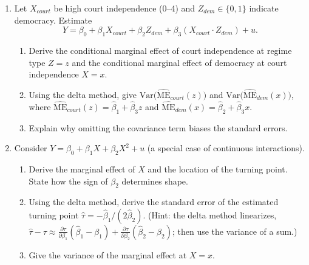 \documentclass[12pt]{article}
\begin{document}
\begin{enumerate}

\item Let $X_{court}$ be high court independence (0--4) and $Z_{dem}\in\{0,1\}$ indicate democracy. Estimate
\[
Y=\beta_0+\beta_1 X_{court}+\beta_2 Z_{dem}+\beta_3(X_{court}\cdot Z_{dem})+u.
\]
\begin{enumerate}\itemsep10em
\item Derive the conditional marginal effect of court independence at regime type $Z=z$ and the conditional marginal effect of democracy at court independence $X=x$.  
\item Using the delta method, give $\mathrm{Var}\!\big(\widehat{\text{ME}}_{court}(z)\big)$ and $\mathrm{Var}\!\big(\widehat{\text{ME}}_{dem}(x)\big)$, where $\widehat{\text{ME}}_{court}(z)=\hat\beta_1+\hat\beta_3 z$ and $\widehat{\text{ME}}_{dem}(x)=\hat\beta_2+\hat\beta_3 x$.  
\item Explain why omitting the covariance term biases the standard errors.  
\end{enumerate}
\clearpage

\item Consider $Y=\beta_0+\beta_1 X+\beta_2 X^2+u$ (a special case of continuous interactions). 
\begin{enumerate}\itemsep10em
\item Derive the marginal effect of $X$ and the location of the turning point. State how the sign of $\beta_2$ determines shape.  
\item Using the delta method, derive the standard error of the estimated turning point $\hat\tau=-\hat\beta_1/(2\hat\beta_2)$. (Hint: the delta method linearizes, $\hat\tau-\tau\approx \frac{\partial\tau}{\partial\beta_1}(\hat\beta_1-\beta_1)+\frac{\partial\tau}{\partial\beta_2}(\hat\beta_2-\beta_2)$; then use the variance of a sum.)  
\item Give the variance of the marginal effect at $X=x$.  
\end{enumerate}

\end{enumerate}
\end{document}
